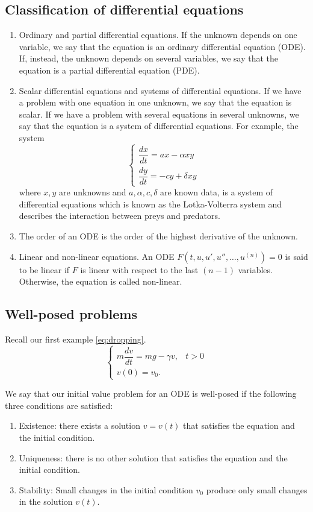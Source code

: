 \documentclass[main.tex]{subfiles}
\begin{document}
\subsection{Classification of differential equations}
\begin{enumerate}
    \item Ordinary and partial differential equations. If the unknown depends on one variable, we say that the equation is an ordinary differential equation (ODE). If, instead, the unknown depends on several variables, we say that the equation is a partial differential equation (PDE). 
    \item Scalar differential equations and systems of differential equations. If we have a problem with one equation in one unknown, we say that the equation is scalar. If we have a problem with several equations in several unknowns, we say that the equation is a system of differential equations. For example, the system$$ 
    \begin{cases}
        \dfrac{dx}{dt} = a x - \alpha x y \\
        \dfrac{dy}{dt} = -cy + \delta x y
    \end{cases}
    $$
    where $x, y$ are unknowns and $a, \alpha, c, \delta$ are known data, is a system of differential equations which is known as the Lotka-Volterra system and describes the interaction between preys and predators. 
    \item The order of an ODE is the order of the highest derivative of the unknown. 
    \item Linear and non-linear equations. An ODE $F(t, u, u', u'', \ldots, u^{(n)}) = 0$ is said to be linear if $F$ is linear with respect to the last $(n - 1)$ variables. Otherwise, the equation is called non-linear. 
\end{enumerate}

\subsection{Well-posed problems}
Recall our first example \eqref{eq:dropping}. 
$$
\begin{cases}
    m \dfrac{dv}{dt} = mg - \gamma v, & t>0\\
    v(0) = v_0.
\end{cases}
$$

\par We say that our initial value problem for an ODE is well-posed if the following three conditions are satisfied:
\begin{enumerate}
    \item Existence: there exists a solution $v = v(t)$ that satisfies the equation and the initial condition. 
    \item Uniqueness: there is no other solution that satisfies the equation and the initial condition. 
    \item Stability: Small changes in the initial condition $v_0$ produce only small changes in the solution $v(t)$. 
\end{enumerate}
\end{document}
